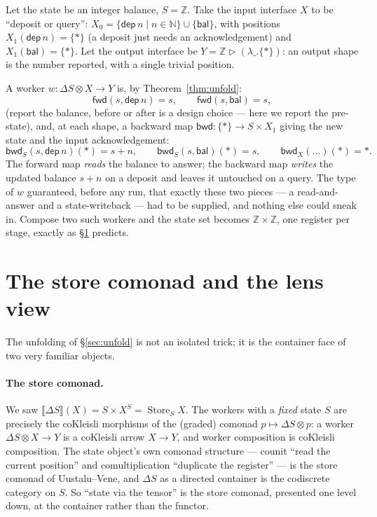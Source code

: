 \documentclass[11pt]{article}
\newcommand{\ctr}{\mathbin{\triangleright}}      %
\newcommand{\ext}[1]{\llbracket #1 \rrbracket}    %
\newcommand{\fwd}{\mathsf{fwd}}
\newcommand{\bwd}{\mathsf{bwd}}
\DeclareMathOperator{\Store}{Store}
\theoremstyle{plain}
\theoremstyle{definition}
\begin{document}
Let the state be an integer balance, $S=\mathbb{Z}$. Take the input interface $X$ to be
``deposit or query'': $X_0=\{\mathsf{dep}\,n \mid n\in\mathbb{N}\}\cup\{\mathsf{bal}\}$, with
positions $X_1(\mathsf{dep}\,n)=\{\ast\}$ (a deposit just needs an acknowledgement) and
$X_1(\mathsf{bal})=\{\ast\}$. Let the output interface be $Y=\mathbb{Z}\ctr(\lambda\_.\{\ast\})$: an
output shape is the number reported, with a single trivial position.

A worker $w:\Delta S\otimes X\to Y$ is, by Theorem~\ref{thm:unfold}:
\[
  \fwd(s,\mathsf{dep}\,n) = s,\qquad \fwd(s,\mathsf{bal}) = s,
\]
(report the balance, before or after is a design choice --- here we report the pre-state), and, at
each shape, a backward map $\bwd:\{\ast\}\to S\times X_1$ giving the new state and the input
acknowledgement:
\[
  \bwd_S(s,\mathsf{dep}\,n)(\ast) = s+n,\qquad \bwd_S(s,\mathsf{bal})(\ast)=s,\qquad
  \bwd_X(\dots)(\ast)=\ast.
\]
The forward map \emph{reads} the balance to answer; the backward map \emph{writes} the updated
balance $s+n$ on a deposit and leaves it untouched on a query. The type of $w$ guaranteed, before
any run, that exactly these two pieces --- a read-and-answer and a state-writeback --- had to be
supplied, and nothing else could sneak in. Compose two such workers and the state set becomes
$\mathbb{Z}\times\mathbb{Z}$, one register per stage, exactly as \S\ref{sec:store} predicts.

\section{The store comonad and the lens view}\label{sec:store}

The unfolding of \S\ref{sec:unfold} is not an isolated trick; it is the container face of two very
familiar objects.

\paragraph{The store comonad.} We saw $\ext{\Delta S}(X)=S\times X^S=\Store_S X$. The workers with a
\emph{fixed} state $S$ are precisely the coKleisli morphisms of the (graded) comonad
$p\mapsto \Delta S\otimes p$: a worker $\Delta S\otimes X\to Y$ is a coKleisli arrow $X\to Y$, and
worker composition is coKleisli composition. The state object's own comonad structure --- counit
``read the current position'' and comultiplication ``duplicate the register'' --- is the store
comonad of Uustalu--Vene, and $\Delta S$ as a directed container is the codiscrete category on $S$.
So ``state via the tensor'' is the store comonad, presented one level down, at the container rather
than the functor.
\end{document}
